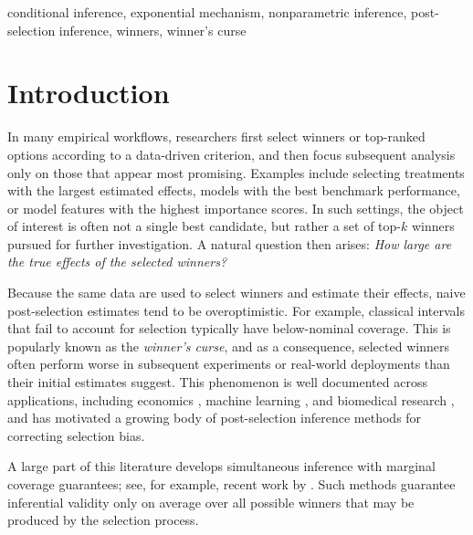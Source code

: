 \documentclass[12pt]{article}
\begin{document}
 conditional inference, exponential mechanism, nonparametric inference, post-selection inference, winners, winner's curse




\section{Introduction}
\label{sec:intro}

In many empirical workflows, researchers first select winners or top-ranked options according to a data-driven criterion, and then focus subsequent analysis only on those that appear most promising.
Examples include selecting treatments with the largest estimated effects, models with the best benchmark performance, or model features with the highest importance scores. 
In such settings, the object of interest is often not a single best candidate, but rather a set of top-$k$ winners pursued for further investigation.
A natural question then arises: \emph{How large are the true effects of the selected winners?}

Because the same data are used to select winners and estimate their effects, naive post-selection estimates tend to be overoptimistic. 
For example, classical intervals that fail to account for selection typically have below-nominal coverage.
This is popularly known as the \textit{winner's
curse}, and as a consequence, selected winners often perform worse in subsequent experiments or real-world deployments than their initial estimates suggest. 
This phenomenon is well documented across applications, including economics \citep{petrou2026inference}, machine learning \citep{lee2018winner}, and biomedical research \citep{zhong2008bias, ferguson2013empirical, forde2023review, guo2021inference}, and has motivated a growing body of
post-selection inference methods for correcting selection bias.

A large part of this literature develops simultaneous inference with marginal coverage guarantees; see, for example, recent work by \citet{andrews2022inference,andrews2024inference, zrnic2024locally,
zrnic2025flexible, petrou2026inference}. 
Such methods guarantee inferential validity only on average
over all possible winners that may be produced by the selection process.
\end{document}
